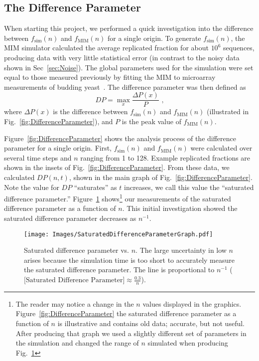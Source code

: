 	
		\subsection{The Difference Parameter}
		\label{subsec:earlywork}
		
		When starting this project, we performed a quick investigation into the difference between $f_\text{sim}(n)$ and $f_\text{MIM}(n)$ for a single origin.
		To generate $f_\text{sim}(n)$, the MIM simulator calculated the average replicated fraction for about $10^6$ sequences, producing data with very little statistical error (in contrast to the noisy data shown in Sec~\ref{sec:Noise}).
		The global parameters used for the simulation were set equal to those measured previously by fitting the MIM to microarray measurements of budding yeast~\cite{ScottsPaper}.
		The difference parameter was then defined as
		\begin{equation} \label{DifferenceParameter}
			DP = \max_{x} {\frac {\Delta P(x)} {P}} \text{ ,}
		\end{equation}
		where $\Delta P(x)$ is the difference between $f_\text{sim}(n)$ and $f_\text{MIM}(n)$ (illustrated in Fig.~\ref{fig:DifferenceParameter}), and $P$ is the peak value of $f_\text{MIM}(n)$.
		
		Figure~\ref{fig:DifferenceParameter} shows the analysis process of the difference parameter for a single origin.
		First, $f_\text{sim}(n)$ and $f_\text{MIM}(n)$ were calculated over several time steps and $n$ ranging from 1 to 128.
		Example replicated fractions are shown in the insets of Fig.~\ref{fig:DifferenceParameter}.
		From these data, we calculated $DP(n,t)$, shown in the main graph of Fig.~\ref{fig:DifferenceParameter}.
		Note the value for $DP$ ``saturates'' as $t$ increases, we call this value the ``saturated difference parameter.''
		Figure~\ref{fig:SaturatedDifferenceParameter} shows\footnote{
		The reader may notice a change in the $n$ values displayed in the graphics. Figure~\ref{fig:DifferenceParameter} the saturated difference parameter as a function of $n$ is illustrative and contains old data; accurate, but not useful.
		After producing that graph we used a slightly different set of parameters in the simulation and changed the range of $n$ simulated when producing Fig.~\ref{fig:SaturatedDifferenceParameter}}
		our measurements of the saturated difference parameter as a function of $n$.
		This initial investigation showed the saturated difference parameter decreases as $n^{-1}$.
		
		\begin{figure}[tbh]
			\begin{center}
				\texttt{[image: Images/SaturatedDifferenceParameterGraph.pdf]}
			\end{center}
				\caption[Saturated Difference Parameter vs. $n$]{\label{fig:SaturatedDifferenceParameter} Saturated difference parameter vs. $n$.
				The large uncertainty in low $n$ arises because the simulation time is too short to accurately measure the saturated difference parameter.
				The line is proportional to $n^{-1}$ ($\text{[Saturated Difference Parameter]} \approx \frac{0.3}{n}$).
				}
		\end{figure}
		
